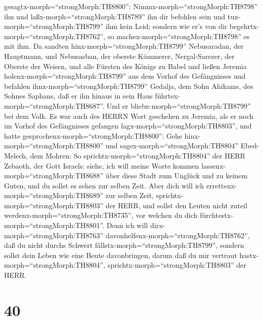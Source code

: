 gesagtx-morph=``strongMorph:TH8800'': 
Nimmx-morph=``strongMorph:TH8798'' ihn und
laßx-morph=``strongMorph:TH8789'' ihn dir befohlen sein und
tux-morph=``strongMorph:TH8799'' ihm kein Leid; sondern wie er's von dir
begehrtx-morph=``strongMorph:TH8762'', so
machex-morph=``strongMorph:TH8798'' es mit ihm.  Da sandten
hinx-morph=``strongMorph:TH8799'' Nebusaradan, der Hauptmann, und
Nebusasban, der oberste Kämmerer, Nergal-Sarezer, der Oberste der
Weisen, und alle Fürsten des Königs zu Babel  und ließen
Jeremia holenx-morph=``strongMorph:TH8799'' aus dem Vorhof des
Gefängnisses und befahlen ihnx-morph=``strongMorph:TH8799'' Gedalja, dem
Sohn Ahikams, des Sohnes Saphans, daß er ihn hinaus in sein Haus
führtex-morph=``strongMorph:TH8687''. Und er
bliebx-morph=``strongMorph:TH8799'' bei dem Volk.  Es war
auch des HERRN Wort geschehen zu Jeremia, als er noch im Vorhof des
Gefängnisses gefangen lagx-morph=``strongMorph:TH8803'', und hatte
gesprochenx-morph=``strongMorph:TH8800'':  Gehe
hinx-morph=``strongMorph:TH8800'' und sagex-morph=``strongMorph:TH8804''
Ebed-Melech, dem Mohren: So sprichtx-morph=``strongMorph:TH8804'' der
HERR Zebaoth, der Gott Israels: siehe, ich will meine Worte kommen
lassenx-morph=``strongMorph:TH8688'' über diese Stadt zum Unglück und zu
keinem Guten, und du sollst es sehen zur selben Zeit.  Aber
dich will ich errettenx-morph=``strongMorph:TH8689'' zur selben Zeit,
sprichtx-morph=``strongMorph:TH8803'' der HERR, und sollst den Leuten
nicht zuteil werdenx-morph=``strongMorph:TH8735'', vor welchen du dich
fürchtestx-morph=``strongMorph:TH8801''.  Denn ich will
dirx-morph=``strongMorph:TH8763''
davonhelfenx-morph=``strongMorph:TH8762'', daß du nicht durchs Schwert
fällstx-morph=``strongMorph:TH8799'', sondern sollst dein Leben wie eine
Beute davonbringen, darum daß du mir vertraut
hastx-morph=``strongMorph:TH8804'',
sprichtx-morph=``strongMorph:TH8803'' der HERR.

\hypertarget{section-39}{%
\section{40}\label{section-39}}

